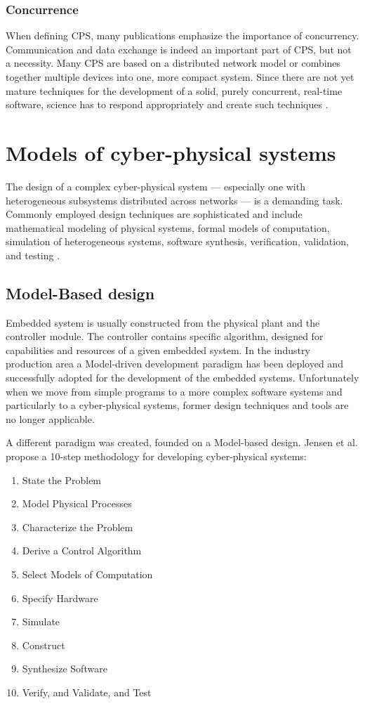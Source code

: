 \documentclass[english,technical,10pt]{FITreport}[2018/01/26]
\begin{document}
\subsubsection{Concurrence}

When defining CPS, many publications emphasize the importance of concurrency. Communication and data exchange is indeed an important part of CPS, but not a necessity. Many CPS are based on a distributed network model or combines together multiple devices into one, more compact system. Since there are not yet mature techniques for the development of a solid, purely concurrent, real-time software, science has to respond appropriately and create such techniques \cite{Lee:2008}.

\section{Models of cyber-physical systems}

The design of a complex cyber-physical system — especially one with heterogeneous subsystems distributed across networks — is a demanding task. Commonly employed design techniques are sophisticated and include mathematical modeling of physical systems, formal models of computation, simulation of heterogeneous systems, software synthesis, verification, validation, and testing \cite{Jensen:2011}.

\subsection{Model-Based design}

Embedded system is usually constructed from the physical plant and the controller module. The controller contains specific algorithm, designed for capabilities and resources of a given embedded system. In the industry production area a Model-driven development paradigm has been deployed and successfully adopted for the development of the embedded systems. Unfortunately when we move from simple programs to a more complex software systems and particularly to a cyber-physical systems, former design techniques and tools are no longer applicable.

A different paradigm was created, founded on a Model-based design. Jensen et al. \cite{Jensen:2011} propose a 10-step methodology for developing cyber-physical systems:

\begin{enumerate}
\item State the Problem
\item Model Physical Processes
\item Characterize the Problem
\item Derive a Control Algorithm
\item Select Models of Computation
\item Specify Hardware
\item Simulate
\item Construct
\item Synthesize Software
\item Verify, and Validate, and Test
\end{enumerate}
\end{document}
